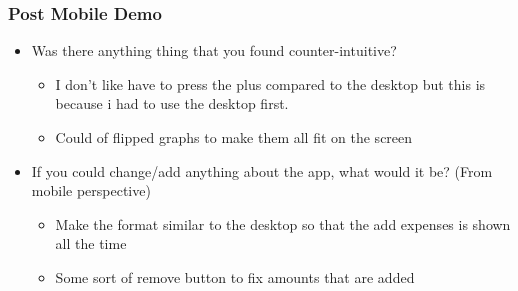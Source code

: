 \documentclass{chi2011}
\begin{document}
	\subsubsection{Post Mobile Demo}
	\begin{itemize}[noitemsep]
		\item Was there anything thing that you found counter-intuitive?
			\begin{itemize}[noitemsep]
				\item I don't like have to press the plus compared to the desktop but this is
				  because i had to use the desktop first. 
			  	\item Could of flipped graphs to make them all fit on the screen
			\end{itemize}
		\item If you could change/add anything about the app, what would it be? (From mobile perspective)
		\begin{itemize}[noitemsep]
			\item Make the format similar to the desktop so that the add
				expenses is shown all the time
			\item Some sort of remove button to fix amounts that are added
		\end{itemize}
	\end{itemize}
\end{document}
